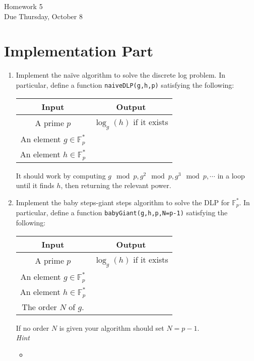\documentclass[11pt]{article}
\newcommand{\bF}{\mathbb{F}}
\begin{document}
\begin{center}
\Large {Homework 5}\\
\small {Due Thursday, October 8}
\end{center}
\section*{Implementation Part}
\begin{enumerate}
  \item{
  Implement the na\"ive algorithm to solve the discrete log problem.  In particular, define a function \verb|naiveDLP(g,h,p)| satisfying the following:
  \begin{center}
    \begin{tabular}{c|c}
      Input & Output\\
      \hline
      A prime $p$ & $\log_g(h)$ if it exists\\
      An element $g\in\bF_p^*$ & \\
      An element $h\in\bF_p^*$ & \\
    \end{tabular}
  \end{center}
 It should work by computing $g\mod p,g^2\mod p,g^3\mod p,\cdots$ in a loop until it finds $h$, then returning the relevant power.
  }
  \item{
  Implement the baby steps-giant steps algorithm to solve the DLP for $\bF_p^*$.  In particular, define a function \verb|babyGiant(g,h,p,N=p-1)| satisfying the following:
  \begin{center}
    \begin{tabular}{c|c}
      Input & Output\\
      \hline
      A prime $p$ & $\log_g(h)$ if it exists\\
      An element $g\in\bF_p^*$ & \\
      An element $h\in\bF_p^*$ & \\
      The order $N$ of $g$.
    \end{tabular}
  \end{center}
  If no order $N$ is given your algorithm should set $N=p-1$.\\
  \textit{Hint}
  \begin{itemize}
    \item{
}
\end{itemize}}
\end{enumerate}
\end{document}
